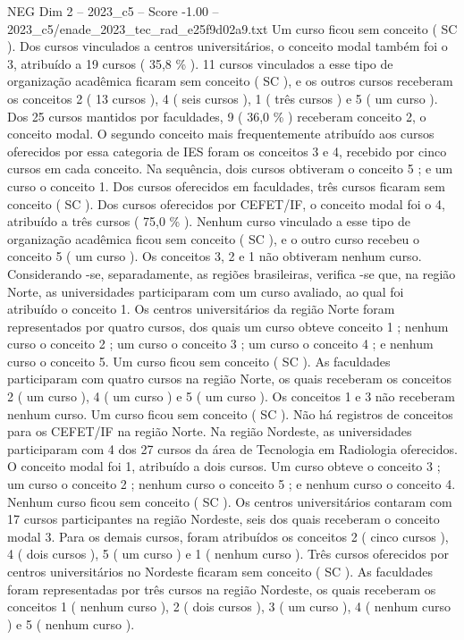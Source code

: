 \begin{textsample}{NEG Dim 2 – 2023\_c5 – Score -1.00 – 2023\_c5/enade\_2023\_tec\_rad\_e25f9d02a9.txt}
Um curso ficou sem conceito ( SC ).
Dos cursos vinculados a centros universitários, o conceito modal também foi o 3, atribuído a 19 cursos ( 35,8 \% ). 11 cursos vinculados a esse tipo de organização acadêmica ficaram sem conceito ( SC ), e os outros cursos receberam os conceitos 2 ( 13 cursos ), 4 ( seis cursos ), 1 ( três cursos ) e 5 ( um curso ).
Dos 25 cursos mantidos por faculdades, 9 ( 36,0 \% ) receberam conceito 2, o conceito modal.
O segundo conceito mais frequentemente atribuído aos cursos oferecidos por essa categoria de IES foram os conceitos 3 e 4, recebido por cinco cursos em cada conceito.
Na sequência, dois cursos obtiveram o conceito 5 ; e um curso o conceito 1.
Dos cursos oferecidos em faculdades, três cursos ficaram sem conceito ( SC ).
Dos cursos oferecidos por CEFET/IF, o conceito modal foi o 4, atribuído a três cursos ( 75,0 \% ).
Nenhum curso vinculado a esse tipo de organização acadêmica ficou sem conceito ( SC ), e o outro curso recebeu o conceito 5 ( um curso ).
Os conceitos 3, 2 e 1 não obtiveram nenhum curso.
Considerando -se, separadamente, as regiões brasileiras, verifica -se que, na região Norte, as universidades participaram com um curso avaliado, ao qual foi atribuído o conceito 1.
Os centros universitários da região Norte foram representados por quatro cursos, dos quais um curso obteve conceito 1 ; nenhum curso o conceito 2 ; um curso o conceito 3 ; um curso o conceito 4 ; e nenhum curso o conceito 5.
Um curso ficou sem conceito ( SC ).
As faculdades participaram com quatro cursos na região Norte, os quais receberam os conceitos 2 ( um curso ), 4 ( um curso ) e 5 ( um curso ).
Os conceitos 1 e 3 não receberam nenhum curso.
Um curso ficou sem conceito ( SC ).
Não há registros de conceitos para os CEFET/IF na região Norte.
Na região Nordeste, as universidades participaram com 4 dos 27 cursos da área de Tecnologia em Radiologia oferecidos.
O conceito modal foi 1, atribuído a dois cursos.
Um curso obteve o conceito 3 ; um curso o conceito 2 ; nenhum curso o conceito 5 ; e nenhum curso o conceito 4.
Nenhum curso ficou sem conceito ( SC ).
Os centros universitários contaram com 17 cursos participantes na região Nordeste, seis dos quais receberam o conceito modal 3.
Para os demais cursos, foram atribuídos os conceitos 2 ( cinco cursos ), 4 ( dois cursos ), 5 ( um curso ) e 1 ( nenhum curso ).
Três cursos oferecidos por centros universitários no Nordeste ficaram sem conceito ( SC ).
As faculdades foram representadas por três cursos na região Nordeste, os quais receberam os conceitos 1 ( nenhum curso ), 2 ( dois cursos ), 3 ( um curso ), 4 ( nenhum curso ) e 5 ( nenhum curso ).

\end{textsample}
